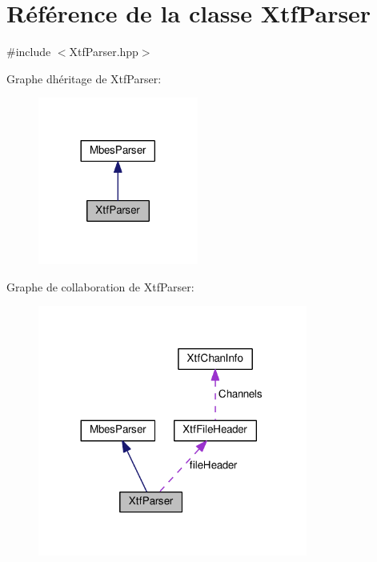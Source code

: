 \hypertarget{classXtfParser}{}\section{Référence de la classe Xtf\+Parser}
\label{classXtfParser}


{\ttfamily \#include $<$Xtf\+Parser.\+hpp$>$}



Graphe d\textquotesingle{}héritage de Xtf\+Parser\+:
\nopagebreak
\begin{figure}[H]
\begin{center}
\leavevmode
\includegraphics[width=149pt]{classXtfParser__inherit__graph}
\end{center}
\end{figure}


Graphe de collaboration de Xtf\+Parser\+:
\nopagebreak
\begin{figure}[H]
\begin{center}
\leavevmode
\includegraphics[width=251pt]{classXtfParser__coll__graph}
\end{center}
\end{figure}
